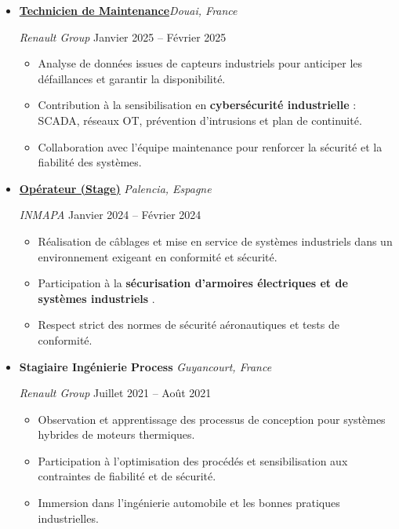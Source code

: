 \documentclass[a4paper,10pt]{article}
\begin{document}
\begin{itemize}[leftmargin=*]

  \item
  \textbf{\href{https://www.renaultgroup.com/}{Technicien de Maintenance}}\hfill \emph{Douai, France} \
  
  \emph{Renault Group} \hfill Janvier 2025 – Février 2025 \
  \begin{itemize}
     \item Analyse de données issues de capteurs industriels pour anticiper les défaillances et garantir la disponibilité.  
    \item Contribution à la sensibilisation en \textbf{cybersécurité industrielle} : SCADA, réseaux OT, prévention d’intrusions et plan de continuité.  
    \item Collaboration avec l’équipe maintenance pour renforcer la sécurité et la fiabilité des systèmes.    
  \end{itemize}

  \item
  \textbf{\href{https://www.inmapa.com/en/}{Opérateur (Stage)}} \hfill \emph{Palencia, Espagne} \
  
  \emph{INMAPA} \hfill Janvier 2024 – Février 2024 \
  \begin{itemize}
    \item Réalisation de câblages et mise en service de systèmes industriels dans un environnement exigeant en conformité et sécurité.  
    \item Participation à la \textbf{sécurisation d’armoires électriques et de systèmes industriels }.  
    \item Respect strict des normes de sécurité aéronautiques et tests de conformité.  
 
  \end{itemize}

  \item
  \textbf{Stagiaire Ingénierie Process} \hfill \emph{Guyancourt, France} \

  \emph{Renault Group} \hfill Juillet 2021 – Août 2021 \
  \begin{itemize}
    \item Observation et apprentissage des processus de conception pour systèmes hybrides de moteurs thermiques.  
    \item Participation à l’optimisation des procédés et sensibilisation aux contraintes de fiabilité et de sécurité.  
    \item Immersion dans l’ingénierie automobile et les bonnes pratiques industrielles.  
  \end{itemize}

\end{itemize}
\end{document}
